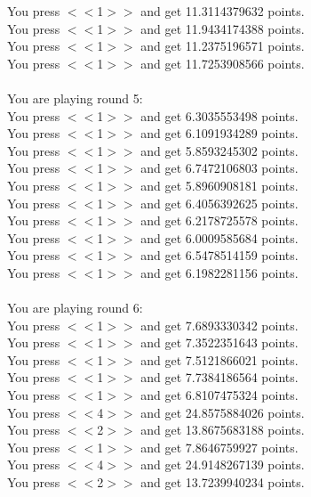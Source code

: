 \documentclass[pdflatex,sn-nature]{sn-jnl}%
\theoremstyle{thmstyleone}%
\theoremstyle{thmstyletwo}%
\theoremstyle{thmstylethree}%
\begin{document}
You press $<<$1$>>$ and get 11.3114379632 points. $~$\\ 
You press $<<$1$>>$ and get 11.9434174388 points. $~$\\ 
You press $<<$1$>>$ and get 11.2375196571 points. $~$\\ 
You press $<<$1$>>$ and get 11.7253908566 points. $~$\\ 
 $~$\\ 
You are playing round 5: $~$\\ 
You press $<<$1$>>$ and get 6.3035553498 points. $~$\\ 
You press $<<$1$>>$ and get 6.1091934289 points. $~$\\ 
You press $<<$1$>>$ and get 5.8593245302 points. $~$\\ 
You press $<<$1$>>$ and get 6.7472106803 points. $~$\\ 
You press $<<$1$>>$ and get 5.8960908181 points. $~$\\ 
You press $<<$1$>>$ and get 6.4056392625 points. $~$\\ 
You press $<<$1$>>$ and get 6.2178725578 points. $~$\\ 
You press $<<$1$>>$ and get 6.0009585684 points. $~$\\ 
You press $<<$1$>>$ and get 6.5478514159 points. $~$\\ 
You press $<<$1$>>$ and get 6.1982281156 points. $~$\\ 
 $~$\\ 
You are playing round 6: $~$\\ 
You press $<<$1$>>$ and get 7.6893330342 points. $~$\\ 
You press $<<$1$>>$ and get 7.3522351643 points. $~$\\ 
You press $<<$1$>>$ and get 7.5121866021 points. $~$\\ 
You press $<<$1$>>$ and get 7.7384186564 points. $~$\\ 
You press $<<$1$>>$ and get 6.8107475324 points. $~$\\ 
You press $<<$4$>>$ and get 24.8575884026 points. $~$\\ 
You press $<<$2$>>$ and get 13.8675683188 points. $~$\\ 
You press $<<$1$>>$ and get 7.8646759927 points. $~$\\ 
You press $<<$4$>>$ and get 24.9148267139 points. $~$\\ 
You press $<<$2$>>$ and get 13.7239940234 points. $~$\\ 
 $~$\\ 
\end{document}
